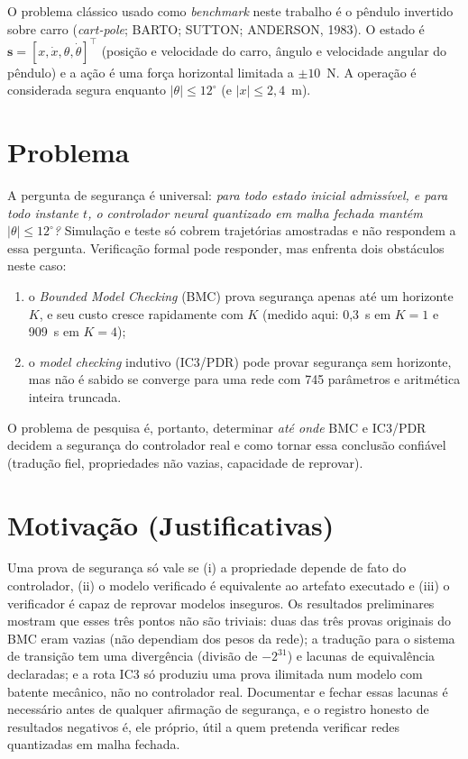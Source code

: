 \documentclass[12pt,openright,oneside,a4paper,chapter=TITLE,sumario=tradicional,english,brazil]{abntex2}
\begin{document}
O problema clássico usado como \emph{benchmark} neste trabalho é o pêndulo invertido sobre carro (\emph{cart-pole}; BARTO; SUTTON; ANDERSON, 1983). O estado é $\mathbf{s}=[x,\dot x,\theta,\dot\theta]^\top$ (posição e velocidade do carro, ângulo e velocidade angular do pêndulo) e a ação é uma força horizontal limitada a $\pm10$~N. A operação é considerada segura enquanto $|\theta|\le12^\circ$ (e $|x|\le2{,}4$~m).

\section{Problema}

A pergunta de segurança é universal: \emph{para todo estado inicial admissível, e para todo instante $t$, o controlador neural quantizado em malha fechada mantém $|\theta|\le12^\circ$?} Simulação e teste só cobrem trajetórias amostradas e não respondem a essa pergunta. Verificação formal pode responder, mas enfrenta dois obstáculos neste caso:
\begin{enumerate}
  \item o \emph{Bounded Model Checking} (BMC) prova segurança apenas até um horizonte $K$, e seu custo cresce rapidamente com $K$ (medido aqui: 0,3~s em $K{=}1$ e 909~s em $K{=}4$);
  \item o \emph{model checking} indutivo (IC3/PDR) pode provar segurança sem horizonte, mas não é sabido se converge para uma rede com 745 parâmetros e aritmética inteira truncada.
\end{enumerate}
O problema de pesquisa é, portanto, determinar \emph{até onde} BMC e IC3/PDR decidem a segurança do controlador real e como tornar essa conclusão confiável (tradução fiel, propriedades não vazias, capacidade de reprovar).

\section{Motivação (Justificativas)}

Uma prova de segurança só vale se (i) a propriedade depende de fato do controlador, (ii) o modelo verificado é equivalente ao artefato executado e (iii) o verificador é capaz de reprovar modelos inseguros. Os resultados preliminares mostram que esses três pontos não são triviais: duas das três provas originais do BMC eram vazias (não dependiam dos pesos da rede); a tradução para o sistema de transição tem uma divergência (divisão de $-2^{31}$) e lacunas de equivalência declaradas; e a rota IC3 só produziu uma prova ilimitada num modelo com batente mecânico, não no controlador real. Documentar e fechar essas lacunas é necessário antes de qualquer afirmação de segurança, e o registro honesto de resultados negativos é, ele próprio, útil a quem pretenda verificar redes quantizadas em malha fechada.
\end{document}
